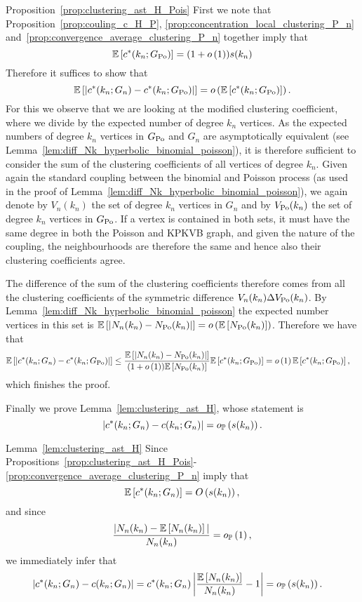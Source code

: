 \begin{proofof}{Proposition~\ref{prop:clustering_ast_H_Pois}}
First we note that Proposition~\ref{prop:couling_c_H_P}, \ref{prop:concentration_local_clustering_P_n} and~\ref{prop:convergence_average_clustering_P_n} together imply that
\[
	\mathbb{E}\left[c^\ast(k_n; G_{{\mathrm{Po}}})\right] = (1+o\left(1\right))s(k_n)
\]
Therefore it suffices to show that
\[
	\mathbb{E}\left[\left|c^\ast(k_n; G_n) - c^\ast(k_n; G_{{\mathrm{Po}}})\right|\right] = o\left(\mathbb{E}\left[c^\ast(k_n; G_{{\mathrm{Po}}})\right]\right).
\]
For this we observe that we are looking at the modified clustering coefficient, where we divide by the expected number of degree $k_n$ vertices. As the expected numbers of degree $k_n$ vertices in $G_{{\mathrm{Po}}}$ and $G_n$ are asymptotically equivalent (see Lemma~\ref{lem:diff_Nk_hyperbolic_binomial_poisson}), it is therefore sufficient to consider the sum of the clustering coefficients of all vertices of degree $k_n$.
Given again the standard coupling between the binomial and Poisson process (as used in the proof of Lemma~\ref{lem:diff_Nk_hyperbolic_binomial_poisson}), we again denote by $V_n(k_n)$ the set of degree $k_n$ vertices in $G_n$ and by $V_{{\mathrm{Po}}}(k_n)$ the set of degree $k_n$ vertices in $G_{{\mathrm{Po}}}$. If a vertex is contained in both sets, it must have the same degree in both the Poisson and KPKVB graph, and given the nature of the coupling, the neighbourhoods are therefore the same and hence also their clustering coefficients agree.

The difference of the sum of the clustering coefficients therefore comes from all the clustering coefficients of the symmetric difference $V_n(k_n) \Delta V_{{\mathrm{Po}}}(k_n)$. By Lemma~\ref{lem:diff_Nk_hyperbolic_binomial_poisson} the expected number vertices in this set is $\mathbb{E}\left[\left|N_{n}(k_n) - N_{{\mathrm{Po}}}(k_n)\right|\right] = o\left(\mathbb{E}\left[N_{{\mathrm{Po}}}(k_n)\right]\right)$. Therefore we have that
\begin{align*}
	\mathbb{E}\left[\left|c^\ast(k_n; G_n) - c^\ast(k_n; G_{{\mathrm{Po}}})\right|\right]
	&\le \frac{\mathbb{E}\left[\left|N_{n}(k_n)-N_{{\mathrm{Po}}}(k_n)\right|\right]}{(1+o\left(1\right))\mathbb{E}\left[N_{{\mathrm{Po}}}(k_n)\right]} \mathbb{E}\left[c^\ast(k_n; G_{{\mathrm{Po}}})\right]
	= o\left(1\right)\mathbb{E}\left[c^\ast(k_n; G_{{\mathrm{Po}}})\right],
\end{align*}
which finishes the proof.
\end{proofof}

Finally we prove Lemma~\ref{lem:clustering_ast_H}, whose statement is
\[
\left|c^\ast(k_n; G_n) - c(k_n; G_n)\right| = o_{\mathbb{P}} \left(s(k_n)\right).
\]


\begin{proofof}{Lemma~\ref{lem:clustering_ast_H}}
	Since Propositions~\ref{prop:clustering_ast_H_Pois}-\ref{prop:convergence_average_clustering_P_n} imply that
	\[
	\mathbb{E}\left[c^\ast(k_n; G_n)\right] = O\left(s(k_n)\right),
	\]  
	and since
	\begin{align*}
	\frac{|N_n(k_n)-\mathbb{E}\left[N_{n}(k_n)\right]|}{N_{n}(k_n)} = o_{\mathbb{P}} \left(1\right),
	\end{align*}
	we immediately infer that
	\begin{align*}
	\left|c^\ast(k_n; G_n) - c(k_n; G_n)\right|
	&= c^\ast(k_n; G_n)\left|\frac{\mathbb{E}\left[N_{n}(k_n)\right]}{N_{n}(k_n)} - 1\right| = o_{\mathbb{P}} \left(s(k_n)\right).
	\end{align*}
\end{proofof}






